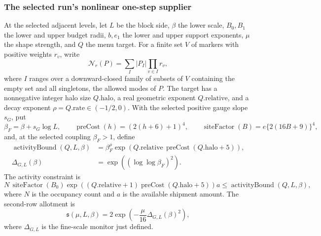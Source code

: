 \subsubsection{The selected run's nonlinear one-step supplier}
\label{subsec:ex-lattice-volant-producer}

At the selected adjacent levels, let $L$ be the block side, $\beta$ the
lower scale, $B_0,B_1$ the lower and upper budget radii, $b,e_1$ the lower
and upper support exponents, $\mu$ the shape strength, and $Q$ the menu
target. For a finite set $V$ of markers with positive weights $r_v$, write
\[
 \mathcal N_r(P)=\sum_{I}|P_I|\prod_{v\in I}r_v,
\]
where $I$ ranges over a downward-closed family of subsets of $V$
containing the empty set and all singletons, the allowed modes of $P$. The target has a nonnegative integer halo size $Q.\mathrm{halo}$,
a real geometric exponent $Q.\mathrm{relative}$, and a decay exponent
$\rho=Q.\mathrm{rate}\in(-1/2,0)$. With the selected positive gauge
slope $s_G$, put
\[
 \beta_F=\beta+s_G\log L,\qquad
 \operatorname{preCost}(h)=(2(h+6)+1)^4,\qquad
 \operatorname{siteFactor}(B)=e\{2(16B+9)\}^4,
\]
and, at the selected coupling $\beta_F>1$, define
\[\begin{aligned}
 \operatorname{activityBound}(Q,L,\beta)
 &=\beta_F^{\rho}\exp\!\left(Q.\mathrm{relative}\,
 \operatorname{preCost}(Q.\mathrm{halo}+5)\right),\\
 \Delta_{G,L}(\beta)&=\exp\!\left((\log\log\beta_F)^2\right).
\end{aligned}\]
The activity constraint is
\begin{equation}
 N\,\operatorname{siteFactor}(B_0)
 \exp\!\left((Q.\mathrm{relative}+1)\operatorname{preCost}(Q.\mathrm{halo}+5)\right)a
 \leq \operatorname{activityBound}(Q,L,\beta),
 \label{eq:ex-lattice-volant-tariff}
\end{equation}
where $N$ is the occupancy count and $a$ is the available shipment amount.
The second-row allotment is
\begin{equation}
 \mathfrak s(\mu,L,\beta)
 =2\exp\!\left(-\frac{\mu}{16}\Delta_{G,L}(\beta)^2\right),
 \label{eq:ex-lattice-volant-straw}
\end{equation}
where $\Delta_{G,L}$ is the fine-scale monitor just defined.

